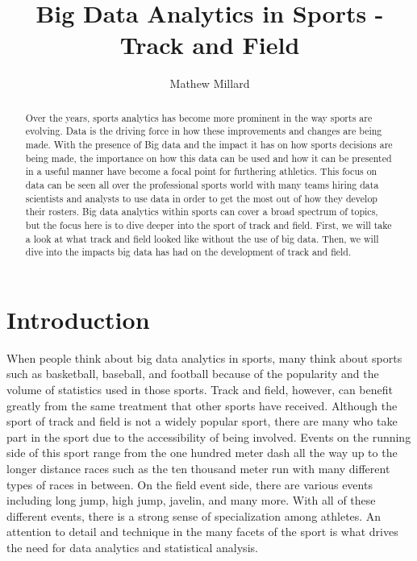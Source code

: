 \documentclass[sigconf]{acmart}
\begin{document}
\title{Big Data Analytics in Sports - Track and Field}


\author{Mathew Millard}

\renewcommand{\shortauthors}{M. Millard}

\begin{abstract}
Over the years, sports analytics has become more prominent in the way sports are evolving. Data is the driving force in how these improvements and changes are being made. With the presence of Big data and the impact it has on how sports decisions are being made, the importance on how this data can be used and how it can be presented in a useful manner have become a focal point for furthering athletics. This focus on data can be seen all over the professional sports world with many teams hiring data scientists and analysts to use data in order to get the most out of how they develop their rosters. Big data analytics within sports can cover a broad spectrum of topics, but the focus here is to dive deeper into the sport of track and field. First, we will take a look at what track and field looked like without the use of big data. Then, we will dive into the impacts big data has had on the development of track and field.
\end{abstract}



\maketitle

\section{Introduction}
When people think about big data analytics in sports, many think about sports such as basketball, baseball, and football because of the popularity and the volume of statistics used in those sports. Track and field, however, can benefit greatly from the same treatment that other sports have received. Although the sport of track and field is not a widely popular sport, there are many who take part in the sport due to the accessibility of being involved. Events on the running side of this sport range from the one hundred meter dash all the way up to the longer distance races such as the ten thousand meter run with many different types of races in between. On the field event side, there are various events including long jump, high jump, javelin, and many more. With all of these different events, there is a strong sense of specialization among athletes. An attention to detail and technique in the many facets of the sport is what drives the need for data analytics and statistical analysis.
\end{document}
